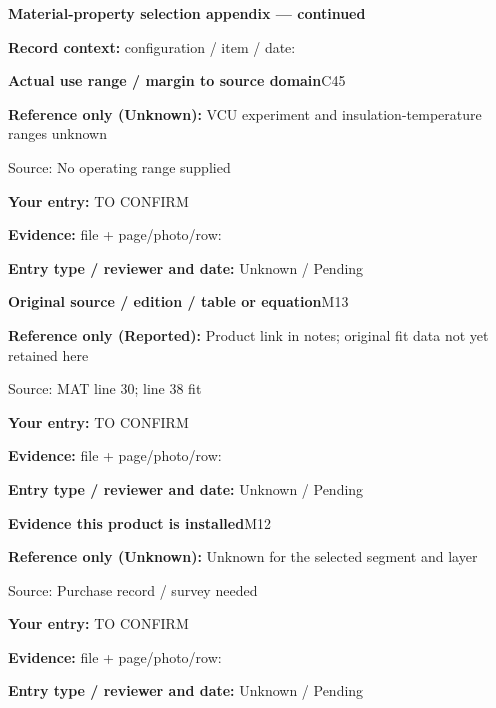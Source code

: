 \documentclass[11pt]{article}
\begin{document}
\clearpage
{\large\bfseries Material-property selection appendix --- continued}\par
\textbf{Record context:} configuration / item / date: \hrulefill\par
\begin{minipage}{\textwidth}\small
{\color{navy}\bfseries Actual use range / margin to source domain}\hfill C45\par
\colorbox{pale}{\parbox{\dimexpr\linewidth-2\fboxsep\relax}{
\textbf{Reference only (Unknown):} VCU experiment and insulation-temperature ranges unknown\par
{\footnotesize Source: No operating range supplied}}}\par
\textbf{Your entry:} {\color{muted}TO CONFIRM}\enspace\hrulefill\par
{\footnotesize\textbf{Evidence:} file + page/photo/row: \hrulefill\par
\textbf{Entry type / reviewer and date:} Unknown / Pending\par
}\end{minipage}\par\vspace{5pt}
\begin{minipage}{\textwidth}\small
{\color{navy}\bfseries Original source / edition / table or equation}\hfill M13\par
\colorbox{pale}{\parbox{\dimexpr\linewidth-2\fboxsep\relax}{
\textbf{Reference only (Reported):} Product link in notes; original fit data not yet retained here\par
{\footnotesize Source: MAT line 30; line 38 fit}}}\par
\textbf{Your entry:} {\color{muted}TO CONFIRM}\enspace\hrulefill\par
{\footnotesize\textbf{Evidence:} file + page/photo/row: \hrulefill\par
\textbf{Entry type / reviewer and date:} Unknown / Pending\par
}\end{minipage}\par\vspace{5pt}
\begin{minipage}{\textwidth}\small
{\color{navy}\bfseries Evidence this product is installed}\hfill M12\par
\colorbox{pale}{\parbox{\dimexpr\linewidth-2\fboxsep\relax}{
\textbf{Reference only (Unknown):} Unknown for the selected segment and layer\par
{\footnotesize Source: Purchase record / survey needed}}}\par
\textbf{Your entry:} {\color{muted}TO CONFIRM}\enspace\hrulefill\par
{\footnotesize\textbf{Evidence:} file + page/photo/row: \hrulefill\par
\textbf{Entry type / reviewer and date:} Unknown / Pending\par
}\end{minipage}\par\vspace{5pt}
\end{document}

